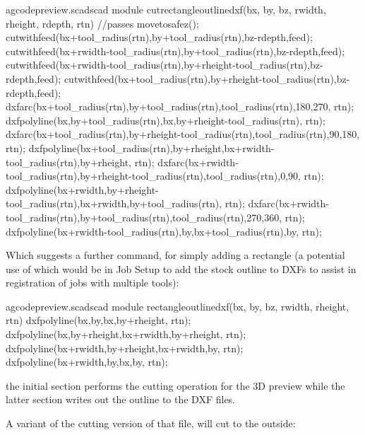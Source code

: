 \documentclass{ltxdoc}
\begin{document}
\lstset{firstnumber=\thegcpscad}
\begin{writecode}{a}{gcodepreview.scad}{scad}
module cutrectangleoutlinedxf(bx, by, bz, rwidth, rheight, rdepth, rtn) {//passes
  movetosafez();
  cutwithfeed(bx+tool_radius(rtn),by+tool_radius(rtn),bz-rdepth,feed);
  cutwithfeed(bx+rwidth-tool_radius(rtn),by+tool_radius(rtn),bz-rdepth,feed);
  cutwithfeed(bx+rwidth-tool_radius(rtn),by+rheight-tool_radius(rtn),bz-rdepth,feed);
  cutwithfeed(bx+tool_radius(rtn),by+rheight-tool_radius(rtn),bz-rdepth,feed);
  dxfarc(bx+tool_radius(rtn),by+tool_radius(rtn),tool_radius(rtn),180,270, rtn);
  dxfpolyline(bx,by+tool_radius(rtn),bx,by+rheight-tool_radius(rtn), rtn);
  dxfarc(bx+tool_radius(rtn),by+rheight-tool_radius(rtn),tool_radius(rtn),90,180, rtn);
  dxfpolyline(bx+tool_radius(rtn),by+rheight,bx+rwidth-tool_radius(rtn),by+rheight, rtn);
  dxfarc(bx+rwidth-tool_radius(rtn),by+rheight-tool_radius(rtn),tool_radius(rtn),0,90, rtn);
  dxfpolyline(bx+rwidth,by+rheight-tool_radius(rtn),bx+rwidth,by+tool_radius(rtn), rtn);
  dxfarc(bx+rwidth-tool_radius(rtn),by+tool_radius(rtn),tool_radius(rtn),270,360, rtn);
  dxfpolyline(bx+rwidth-tool_radius(rtn),by,bx+tool_radius(rtn),by, rtn);
}

\end{writecode}
\addtocounter{gcpscad}{16}

Which suggests a further command, 
for simply adding a rectangle (a potential use of
which would be in Job Setup to add the stock outline to DXFs to assist in registration 
of jobs with multiple tools):

\lstset{firstnumber=\thegcpscad}
\begin{writecode}{a}{gcodepreview.scad}{scad}
module rectangleoutlinedxf(bx, by, bz, rwidth, rheight, rtn) {
  dxfpolyline(bx,by,bx,by+rheight, rtn);
  dxfpolyline(bx,by+rheight,bx+rwidth,by+rheight, rtn);
  dxfpolyline(bx+rwidth,by+rheight,bx+rwidth,by, rtn);
  dxfpolyline(bx+rwidth,by,bx,by, rtn);
}

\end{writecode}
\addtocounter{gcpscad}{7}

\noindent the initial section performs the cutting operation for the 3D preview while the 
latter section writes out the outline to the DXF files.

A variant of the  cutting version of that file,  
will cut to the outside:
\end{document}
